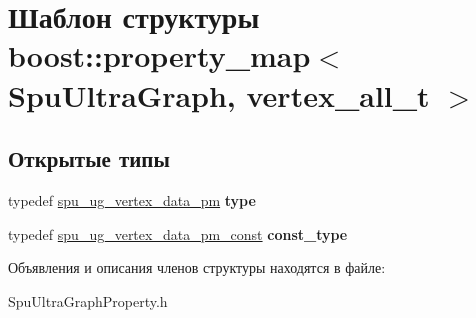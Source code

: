 \hypertarget{structboost_1_1property__map_3_01_spu_ultra_graph_00_01vertex__all__t_01_4}{}\section{Шаблон структуры boost\+:\+:property\+\_\+map$<$ Spu\+Ultra\+Graph, vertex\+\_\+all\+\_\+t $>$}
\label{structboost_1_1property__map_3_01_spu_ultra_graph_00_01vertex__all__t_01_4}
\subsection*{Открытые типы}
\begin{DoxyCompactItemize}
\item 
\mbox{\label{structboost_1_1property__map_3_01_spu_ultra_graph_00_01vertex__all__t_01_4_ada854241a377855e92b0d6e0e7ba2194}} 
typedef \hyperlink{classboost_1_1spu__ug__property__map}{spu\+\_\+ug\+\_\+vertex\+\_\+data\+\_\+pm} {\bfseries type}
\item 
\mbox{\label{structboost_1_1property__map_3_01_spu_ultra_graph_00_01vertex__all__t_01_4_a7c257c30104ecb41c254e61d6a356d7c}} 
typedef \hyperlink{classboost_1_1spu__ug__readable__property__map}{spu\+\_\+ug\+\_\+vertex\+\_\+data\+\_\+pm\+\_\+const} {\bfseries const\+\_\+type}
\end{DoxyCompactItemize}


Объявления и описания членов структуры находятся в файле\+:\begin{DoxyCompactItemize}
\item 
Spu\+Ultra\+Graph\+Property.\+h\end{DoxyCompactItemize}
